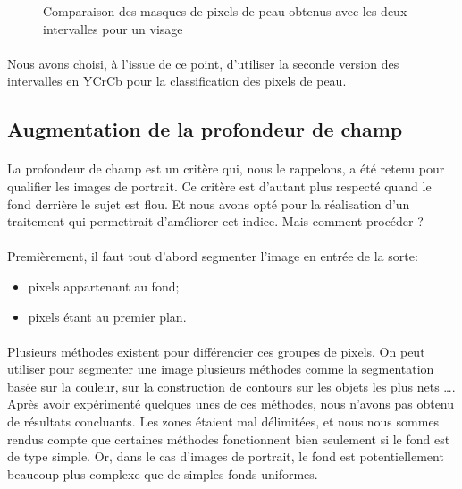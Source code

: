 \documentclass[11pt, french]{report-rd-info}
\begin{document}
\begin{figure}[htp]
 \caption{Comparaison des masques de pixels de peau obtenus avec les deux intervalles pour un visage}
 \label{fig:IntervalleMasquePeau1}
\end{figure}

\paragraph*{}
Nous avons choisi, à l'issue de ce point, d'utiliser la seconde version des intervalles en YCrCb pour la classification des pixels de peau.

\subsection{Augmentation de la profondeur de champ}
\paragraph*{}
La profondeur de champ est un critère qui, nous le rappelons, a été retenu pour qualifier les images de portrait. Ce critère est d'autant plus respecté quand le fond derrière le sujet est flou. Et nous avons opté pour la réalisation d'un traitement qui permettrait d'améliorer cet indice. Mais comment procéder  ?

\paragraph*{}
Premièrement, il faut tout d'abord segmenter l'image en entrée de la sorte: 
\begin{itemize}
\item pixels appartenant au fond;
\item pixels étant au premier plan.
\end{itemize} 

\paragraph*{}
Plusieurs méthodes existent pour différencier ces groupes de pixels. On peut utiliser pour segmenter une image plusieurs méthodes comme la segmentation basée sur la couleur, sur la construction de contours sur les objets les plus nets \dots. 
Après avoir expérimenté quelques unes de ces méthodes, nous n'avons pas obtenu de résultats concluants. Les zones étaient mal délimitées, et nous nous sommes rendus compte que certaines méthodes fonctionnent bien seulement si le fond est de type simple. Or, dans le cas d'images de portrait, le fond est potentiellement beaucoup plus complexe que de simples fonds uniformes.
\end{document}

